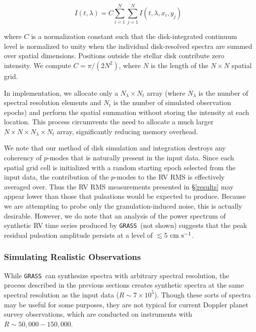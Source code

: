 \documentclass[twocolumn]{aastex63}
\newcommand{\cms}{\ {\rm cm\ s}^{-1}}
\newcommand{\grass}{\texttt{GRASS}}
\newcommand{\revise}[1]{#1}
\begin{document}
\begin{equation}
    I(t, \lambda) = C \sum_{i=1}^N\sum_{j=1}^N  I(t, \lambda, x_{i}, y_{j})
\end{equation}

\noindent where $C$ is a normalization constant such that the disk-integrated continuum level is normalized to unity when the individual disk-resolved spectra are summed over spatial dimensions. Positions outside the stellar disk contribute zero intensity. We compute $C = \pi / (2N^2)$, where $N$ is the length of the $N \times N$ spatial grid. \par

In implementation, we allocate only a $N_\lambda \times N_t$ array (where $N_\lambda$ is the number of spectral resolution elements and $N_t$ is the number of simulated observation epochs) and perform the spatial summation without storing the intensity at each location. This process circumvents the need to allocate a much larger $N\times N\times N_\lambda \times N_t$ array, significantly reducing memory overhead. \par 

We note that our method of disk simulation and integration destroys any coherency of $p$-modes that is naturally present in the input data. Since each spatial grid cell is initialized with a random starting epoch selected from the input data, the contribution of the $p$-modes to the RV RMS is effectively averaged over. Thus the RV RMS measurements presented in \S\ref{results} may appear lower than those that pulsations would be expected to produce. Because we are attempting to probe only the granulation-induced noise, this is actually desirable. \revise{However, we do note that an analysis of the power spectrum of synthetic RV time series produced by \grass\ (not shown) suggests that the peak residual pulsation amplitude persists at a level of $\lesssim$5$\cms$.} \par 

\subsubsection{Simulating Realistic Observations} \label{subsubsec:obs}
While \grass\ can synthesize spectra with arbitrary spectral resolution, the process described in the previous sections creates synthetic spectra at 
the same spectral resolution as the input data ($R \sim 7\times10^5$). Though these sorts of spectra may be useful for some purposes, they are not typical for current Doppler planet survey observations, which are conducted on instruments with $R \sim 50,000 - 150,000$. \par 
\end{document}
